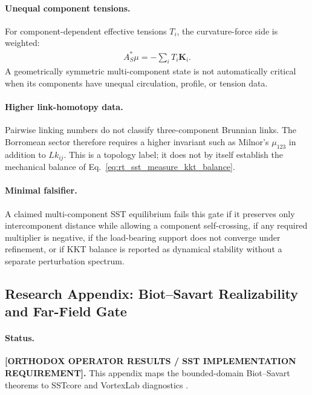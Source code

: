     \paragraph{Unequal component tensions.}
    For component-dependent effective tensions \(T_i\), the curvature-force side is
    weighted:
    \begin{align}
        A_S^*\mu
        =
        -\sum_i T_i\mathbf K_i.
        \label{eq:rt_gehring_unequal_tension_balance}
    \end{align}
    A geometrically symmetric multi-component state is not automatically critical
    when its components have unequal circulation, profile, or tension data.

    \paragraph{Higher link-homotopy data.}
    Pairwise linking numbers do not classify three-component Brunnian links.  The
    Borromean sector therefore requires a higher invariant such as Milnor's
    \(\mu_{123}\) in addition to \(Lk_{ij}\).  This is a topology label; it does not
    by itself establish the mechanical balance of Eq.~\eqref{eq:rt_sst_measure_kkt_balance}.

    \paragraph{Minimal falsifier.}
    A claimed multi-component SST equilibrium fails this gate if it preserves only
    intercomponent distance while allowing a component self-crossing, if any required
    multiplier is negative, if the load-bearing support does not converge under
    refinement, or if KKT balance is reported as dynamical stability without a
    separate perturbation spectrum.

\subsection{Research Appendix: Biot--Savart Realizability and Far-Field Gate}
    \label{subsec:rt_biot_savart_realizability}

    \paragraph{Status.}
    \textbf{[ORTHODOX OPERATOR RESULTS / SST IMPLEMENTATION REQUIREMENT].}
    This appendix maps the bounded-domain Biot--Savart theorems to SSTcore and
    VortexLab diagnostics
    \cite{CantarellaDeTurckGluck2001BiotSavart}.

